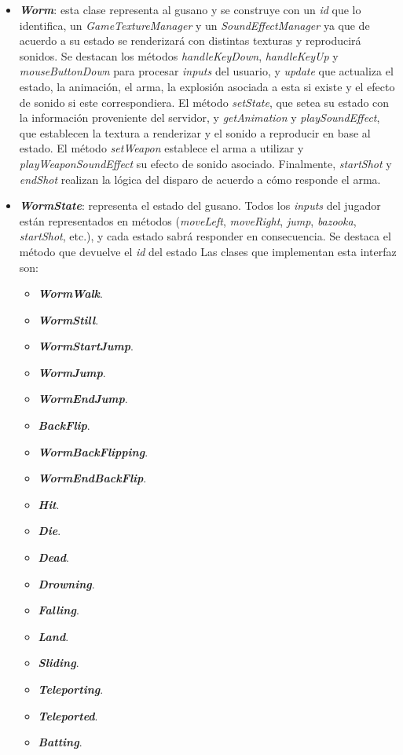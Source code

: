 \begin{itemize}
	\item \textbf{\textit{Worm}}: esta clase representa al gusano y se construye con un \textit{id} que lo identifica, un \textit{GameTextureManager} y un \textit{SoundEffectManager} ya que de acuerdo a su estado se renderizará con distintas texturas y reproducirá sonidos. Se destacan los métodos \textit{handleKeyDown}, \textit{handleKeyUp} y \textit{mouseButtonDown} para procesar \textit{inputs} del usuario, y \textit{update} que actualiza el estado, la animación, el arma, la explosión asociada a esta si existe y el efecto de sonido si este correspondiera. El método \textit{setState}, que setea su estado con la información proveniente del servidor, y \textit{getAnimation} y \textit{playSoundEffect}, que establecen la textura a renderizar y el sonido a reproducir en base al estado. El método \textit{setWeapon} establece el arma a utilizar y \textit{playWeaponSoundEffect} su efecto de sonido asociado. Finalmente, \textit{startShot} y \textit{endShot} realizan la lógica del disparo de acuerdo a cómo responde el arma.

	\item \textbf{\textit{WormState}}: representa el estado del gusano. Todos los \textit{inputs} del jugador están representados en métodos (\textit{moveLeft}, \textit{moveRight}, \textit{jump}, \textit{bazooka}, \textit{startShot}, etc.), y cada estado sabrá responder en consecuencia. Se destaca el método que devuelve el \textit{id} del estado  Las clases que implementan esta interfaz son:
	\begin{itemize}
		\item \textbf{\textit{WormWalk}}.
		\item \textbf{\textit{WormStill}}.
		\item \textbf{\textit{WormStartJump}}.
		\item \textbf{\textit{WormJump}}.
		\item \textbf{\textit{WormEndJump}}.
		\item \textbf{\textit{BackFlip}}.
		\item \textbf{\textit{WormBackFlipping}}.
		\item \textbf{\textit{WormEndBackFlip}}.
		\item \textbf{\textit{Hit}}.
		\item \textbf{\textit{Die}}.
		\item \textbf{\textit{Dead}}.
		\item \textbf{\textit{Drowning}}.
		\item \textbf{\textit{Falling}}.
		\item \textbf{\textit{Land}}.
		\item \textbf{\textit{Sliding}}.
		\item \textbf{\textit{Teleporting}}.
		\item \textbf{\textit{Teleported}}.
		\item \textbf{\textit{Batting}}.
	\end{itemize}


\end{itemize}
